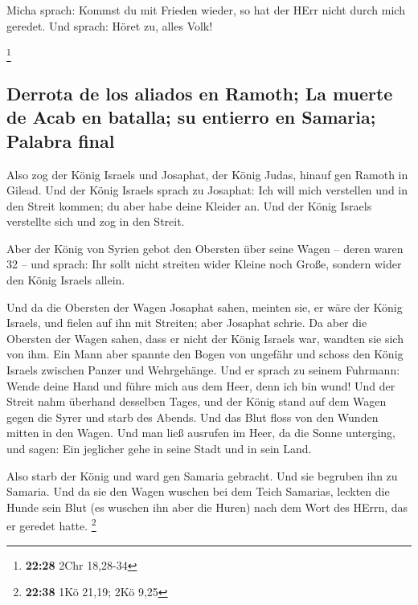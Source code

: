  Micha sprach: Kommst du mit Frieden wieder, so hat der
HErr nicht durch mich geredet. Und sprach: Höret zu, alles Volk!

\footnote{\textbf{22:28} 2Chr 18,28-34}

\hypertarget{derrota-de-los-aliados-en-ramoth-la-muerte-de-acab-en-batalla-su-entierro-en-samaria-palabra-final}{%
\subsection{Derrota de los aliados en Ramoth; La muerte de Acab en
batalla; su entierro en Samaria; Palabra
final}\label{derrota-de-los-aliados-en-ramoth-la-muerte-de-acab-en-batalla-su-entierro-en-samaria-palabra-final}}

 Also zog der König Israels und Josaphat, der König
Judas, hinauf gen Ramoth in Gilead.  Und der König
Israels sprach zu Josaphat: Ich will mich verstellen und in den Streit
kommen; du aber habe deine Kleider an. Und der König Israels verstellte
sich und zog in den Streit.

 Aber der König von Syrien gebot den Obersten über seine
Wagen -- deren waren 32 -- und sprach: Ihr sollt nicht streiten wider
Kleine noch Große, sondern wider den König Israels allein.

 Und da die Obersten der Wagen Josaphat sahen, meinten
sie, er wäre der König Israels, und fielen auf ihn mit Streiten; aber
Josaphat schrie.  Da aber die Obersten der Wagen sahen,
dass er nicht der König Israels war, wandten sie sich von ihm.
 Ein Mann aber spannte den Bogen von ungefähr und schoss
den König Israels zwischen Panzer und Wehrgehänge. Und er sprach zu
seinem Fuhrmann: Wende deine Hand und führe mich aus dem Heer, denn ich
bin wund!  Und der Streit nahm überhand desselben Tages,
und der König stand auf dem Wagen gegen die Syrer und starb des Abends.
Und das Blut floss von den Wunden mitten in den Wagen. 
Und man ließ ausrufen im Heer, da die Sonne unterging, und sagen: Ein
jeglicher gehe in seine Stadt und in sein Land.

 Also starb der König und ward gen Samaria gebracht. Und
sie begruben ihn zu Samaria.  Und da sie den Wagen
wuschen bei dem Teich Samarias, leckten die Hunde sein Blut (es wuschen
ihn aber die Huren) nach dem Wort des HErrn, das er geredet hatte.
\footnote{\textbf{22:38} 1Kö 21,19; 2Kö 9,25}

